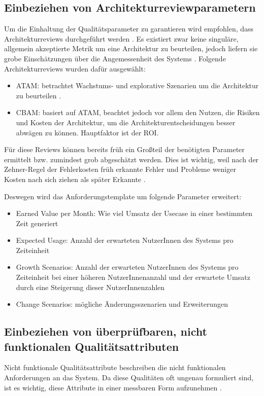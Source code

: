 \subsection{Einbeziehen von Architekturreviewparametern}
Um die Einhaltung der Qualitätsparameter zu garantieren wird empfohlen, dass Architekturreviews durchgeführt werden \cite[S. 20]{review}. Es existiert zwar \glqq keine singuläre, allgemein akzeptierte Metrik um eine Architektur zu beurteilen\grqq \cite[S. 19]{review}, jedoch liefern sie grobe Einschätzungen über die Angemessenheit des Systems \cite[S. 20]{review}. Folgende Architekturreviews wurden dafür ausgewählt:

\begin{itemize}
  \item ATAM: betrachtet Wachstums- und explorative Szenarien um die Architektur zu beurteilen \cite[S. 61]{review}.
  \item CBAM: basiert auf ATAM, beachtet jedoch vor allem den Nutzen, die Risiken und Kosten der Architektur, um die Architekturentscheidungen besser abwägen zu können. Hauptfaktor ist der ROI. \cite[S. 67]{review}
\end{itemize}

Für diese Reviews können bereits früh ein Großteil der benötigten Parameter ermittelt bzw. zumindest grob abgeschätzt werden. Dies ist wichtig, weil nach der Zehner-Regel der Fehlerkosten früh erkannte Fehler und Probleme weniger Kosten nach sich ziehen als später Erkannte \cite[S. 154]{fehler}.

Deswegen wird das Anforderungstemplate um folgende Parameter erweitert:

\begin{itemize}
  \item Earned Value per Month: Wie viel Umsatz der Usecase in einer bestimmten Zeit generiert
  \item Expected Usage: Anzahl der erwarteten NutzerInnen des Systems pro Zeiteinheit
  \item Growth Scenarios: Anzahl der erwarteten NutzerInnen des Systems pro Zeiteinheit bei einer höheren NutzerInnenanzahl und der erwartete Umsatz durch eine Steigerung dieser NutzerInnenzahlen
  \item Change Scenarios: mögliche Änderungsszenarien und Erweiterungen
\end{itemize}

\subsection{Einbeziehen von überprüfbaren, nicht funktionalen Qualitätsattributen}
Nicht funktionale Qualitätsattribute beschreiben die nicht funktionalen Anforderungen an das System. Da diese Qualitäten oft ungenau formuliert sind, ist es wichtig, diese Attribute in einer messbaren Form aufzunehmen \cite[S. 9]{effektiv}.

